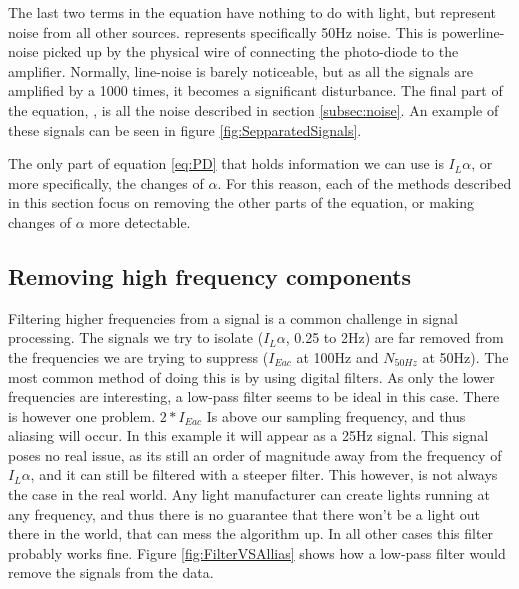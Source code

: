 The last two terms in the equation have nothing to do with light, but represent noise from all other sources.  represents specifically 50Hz noise. This is powerline-noise picked up by the physical wire of connecting the photo-diode to the amplifier. Normally, line-noise is barely noticeable, but as all the signals are amplified by a 1000 times, it becomes a significant disturbance. The final part of the equation, , is all the noise described in section \ref{subsec:noise}. An example of these signals can be seen in figure \ref{fig:SepparatedSignals}.

The only part of equation \ref{eq:PD} that holds information we can use is $I_{L} \alpha$, or more specifically, the changes of $\alpha$. For this reason, each of the methods described in this section focus on removing the other parts of the equation, or making changes of $\alpha$ more detectable.


\subsection{Removing high frequency components}
\label{subsec:removeing_AC}
Filtering higher frequencies from a signal is a common challenge in signal processing. The signals we try to isolate ($I_{L}\alpha$, 0.25 to 2Hz) are far removed from the frequencies we are trying to suppress ($I_{Eac}$ at 100Hz and $N_{50Hz}$ at 50Hz). The most common method of doing this is by using digital filters. As only the lower frequencies are interesting, a low-pass filter seems to be ideal in this case. There is however one problem. $2 * I_{Eac}$ Is above our sampling frequency, and thus aliasing will occur. In this example it will appear as a 25Hz signal. This signal poses no real issue, as its still an order of magnitude away from the frequency of $ I_{L} \alpha$, and it can still be filtered with a steeper filter. This however, is not always the case in the real world. Any light manufacturer can create lights running at any frequency, and thus there is no guarantee that there won't be a light out there in the world, that can mess the algorithm up. In all other cases this filter probably works fine. Figure \ref{fig:FilterVSAllias} shows how a low-pass filter would remove the signals from the data.

